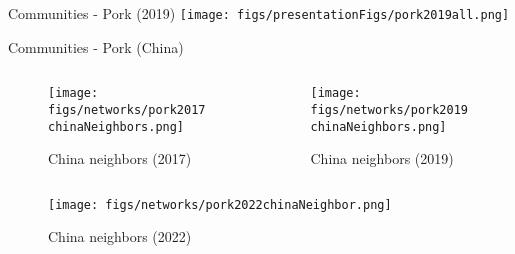 \documentclass[10pt,xcolor={dvipsnames}]{beamer}
\begin{document}
\begin{frame}{Communities - Pork (2019)}
    \texttt{[image: figs/presentationFigs/pork2019all.png]}
\end{frame}


\iffalse
\begin{frame}{Communities - Pork (China)}

\begin{columns}[onlytextwidth]
    \begin{column}{.5\textwidth}
        \begin{minipage}[t][.5\textheight][t]{\textwidth}
            \begin{figure}
                \caption*{\tiny China neighbors (2017)}
                \texttt{[image: figs/networks/pork2017chinaNeighbors.png]}
            \end{figure}
        \end{minipage}
    \end{column}
\hfill
    \begin{column}{.5\textwidth}
        \begin{minipage}[t][.5\textheight][t]{\textwidth}
            \begin{figure}
                \caption*{\tiny China neighbors (2019)}
                \texttt{[image: figs/networks/pork2019chinaNeighbors.png]}\\
            \end{figure}
        \end{minipage}
    \end{column}
\end{columns}
\vspace{-35pt}
\begin{figure}
    \centering
    \caption*{\tiny China neighbors (2022)}    
    \texttt{[image: figs/networks/pork2022chinaNeighbor.png]}    
\end{figure}

\end{frame}
\end{document}
